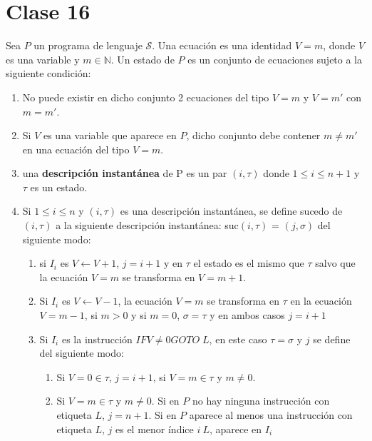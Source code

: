 \section{Clase 16}

\begin{definition}
Sea $P$ un programa de lenguaje $\mathcal{S}$. Una ecuaci\'on es una identidad $V = m$, donde $V$ es una variable y $m \in \mathbb{N}$. Un estado de $P$ es un conjunto de ecuaciones sujeto a la siguiente condici\'on:
 
\begin{enumerate}
	\item No puede existir en dicho conjunto 2 ecuaciones del tipo $V = m$ y $V = m'$ con $m = m'$.
	\item Si $V$ es una variable que aparece en $P$, dicho conjunto debe contener $m \neq m'$ en una ecuaci\'on del tipo $V = m$.
	\item una \textbf{descripci\'on instant\'anea} de P es un par $(i, \tau)$ donde $1 \leq i \leq n + 1$	y $\tau$ es un estado.
	\item Si $1 \leq i \leq n$ y $(i, \tau)$ es una descripci\'on instant\'anea, se define sucedo de $(i, \tau)$ a la siguiente descripci\'on instant\'anea: suc$(i, \tau)$ = $(j, \sigma)$ del siguiente modo:
	\begin{enumerate}
		\item si $I_{i}$ es $V \leftarrow V + 1$, $j = i + 1$ y en $\tau$ el estado es el mismo que $\tau$ salvo que la ecuaci\'on $V = m$ se transforma en $V = m + 1$.
		\item Si $I_{i}$ es $V \leftarrow V - 1$, la ecuaci\'on $V = m$ se transforma en $\tau$ en la ecuaci\'on $V = m - 1$, si $m > 0$ y si $m = 0$, $\sigma = \tau$ y en ambos casos $j = i + 1$
		\item Si $I_{i}$ es la instrucci\'on $IF V \neq 0 GOTO \; L$, en este caso $\tau = \sigma$ y $j$ se define del siguiente modo:
		\begin{enumerate}
			\item Si $V = 0 \in \tau$, $j = i + 1$, si $V = m \in \tau$ y $m \neq 0$.
			\item Si $V = m \in \tau$ y $m \neq 0$. Si en $P$ no hay ninguna instrucci\'on con etiqueta $L$, $j = n + 1$. Si en $P$ aparece al menos una instrucci\'on con etiqueta $L$, $j$ es el menor \'indice $i \ L$, aparece en $I_{i}$
		\end{enumerate}
	\end{enumerate}
\end{enumerate}
\end{definition}
 
